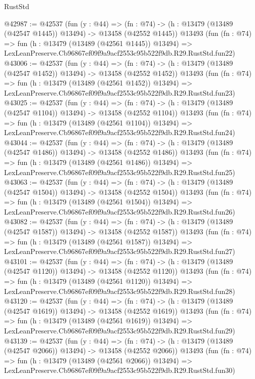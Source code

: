 \begin{lexlean}{RustStd}
\begin{coremodule}
@42987 := @42537
    (fun (y : @44) =>
    (fn : @74) -> (h : @13479 (@13489 (@42547 @1445)) @13494) -> @13458 (@42552 @1445))
    @13493
    (fun (fn : @74) =>
    fun (h : @13479 (@13489 (@42561 @1445)) @13494) =>
    LexLeanPreserve.Cb96867ef09f9a9acf2553c95b522f9db.R29.RustStd.fun22)
@43006 := @42537
    (fun (y : @44) =>
    (fn : @74) -> (h : @13479 (@13489 (@42547 @1452)) @13494) -> @13458 (@42552 @1452))
    @13493
    (fun (fn : @74) =>
    fun (h : @13479 (@13489 (@42561 @1452)) @13494) =>
    LexLeanPreserve.Cb96867ef09f9a9acf2553c95b522f9db.R29.RustStd.fun23)
@43025 := @42537
    (fun (y : @44) =>
    (fn : @74) -> (h : @13479 (@13489 (@42547 @1104)) @13494) -> @13458 (@42552 @1104))
    @13493
    (fun (fn : @74) =>
    fun (h : @13479 (@13489 (@42561 @1104)) @13494) =>
    LexLeanPreserve.Cb96867ef09f9a9acf2553c95b522f9db.R29.RustStd.fun24)
@43044 := @42537
    (fun (y : @44) =>
    (fn : @74) -> (h : @13479 (@13489 (@42547 @1486)) @13494) -> @13458 (@42552 @1486))
    @13493
    (fun (fn : @74) =>
    fun (h : @13479 (@13489 (@42561 @1486)) @13494) =>
    LexLeanPreserve.Cb96867ef09f9a9acf2553c95b522f9db.R29.RustStd.fun25)
@43063 := @42537
    (fun (y : @44) =>
    (fn : @74) -> (h : @13479 (@13489 (@42547 @1504)) @13494) -> @13458 (@42552 @1504))
    @13493
    (fun (fn : @74) =>
    fun (h : @13479 (@13489 (@42561 @1504)) @13494) =>
    LexLeanPreserve.Cb96867ef09f9a9acf2553c95b522f9db.R29.RustStd.fun26)
@43082 := @42537
    (fun (y : @44) =>
    (fn : @74) -> (h : @13479 (@13489 (@42547 @1587)) @13494) -> @13458 (@42552 @1587))
    @13493
    (fun (fn : @74) =>
    fun (h : @13479 (@13489 (@42561 @1587)) @13494) =>
    LexLeanPreserve.Cb96867ef09f9a9acf2553c95b522f9db.R29.RustStd.fun27)
@43101 := @42537
    (fun (y : @44) =>
    (fn : @74) -> (h : @13479 (@13489 (@42547 @1120)) @13494) -> @13458 (@42552 @1120))
    @13493
    (fun (fn : @74) =>
    fun (h : @13479 (@13489 (@42561 @1120)) @13494) =>
    LexLeanPreserve.Cb96867ef09f9a9acf2553c95b522f9db.R29.RustStd.fun28)
@43120 := @42537
    (fun (y : @44) =>
    (fn : @74) -> (h : @13479 (@13489 (@42547 @1619)) @13494) -> @13458 (@42552 @1619))
    @13493
    (fun (fn : @74) =>
    fun (h : @13479 (@13489 (@42561 @1619)) @13494) =>
    LexLeanPreserve.Cb96867ef09f9a9acf2553c95b522f9db.R29.RustStd.fun29)
@43139 := @42537
    (fun (y : @44) =>
    (fn : @74) -> (h : @13479 (@13489 (@42547 @2066)) @13494) -> @13458 (@42552 @2066))
    @13493
    (fun (fn : @74) =>
    fun (h : @13479 (@13489 (@42561 @2066)) @13494) =>
    LexLeanPreserve.Cb96867ef09f9a9acf2553c95b522f9db.R29.RustStd.fun30)

\end{coremodule}
\end{lexlean}
